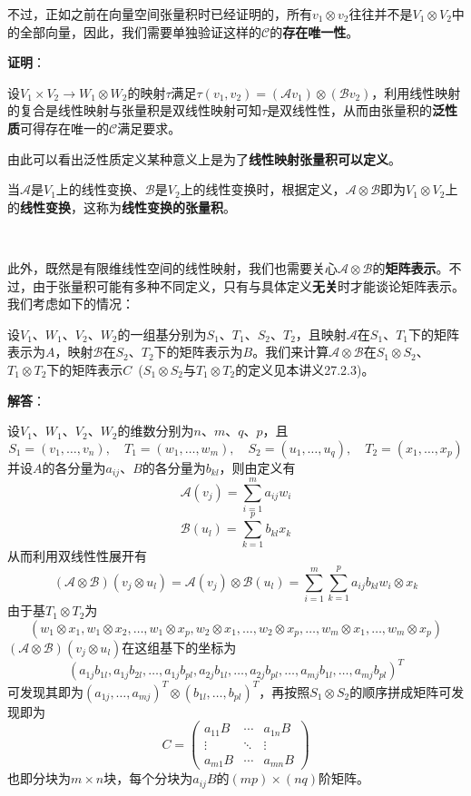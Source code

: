 \documentclass[a4paper,UTF8,fontset=windows,AutoFakeBold]{ctexart}
\newcommand*{\ma}{\mathcal{A}}
\newcommand*{\mb}{\mathcal{B}}
\newcommand*{\mc}{\mathcal{C}}
\newcommand*{\note}{\noindent *}
\newcommand{\proo}[1]{{\vspace{5pt}\kaishu\noindent\textbf{证明}：\vspace{-3pt}
\begin{compactitem}
    \item[] #1
\end{compactitem}
}}
\newcommand{\sol}[1]{{\vspace{5pt}\kaishu\noindent\textbf{解答}：\vspace{-3pt}
\begin{compactitem}
    \item[] #1
\end{compactitem}
}}
\begin{document}
不过，正如之前在向量空间张量积时已经证明的，所有$v_1\otimes v_2$往往并不是$V_1\otimes V_2$中的全部向量，因此，我们需要单独验证这样的$\mathcal{C}$的\textbf{存在唯一性}。

\proo{
    设$V_1\times V_2\to W_1\otimes W_2$的映射$\tau$满足$\tau(v_1,v_2)=(\ma v_1)\otimes(\mb v_2)$，利用线性映射的复合是线性映射与张量积是双线性映射可知$\tau$是双线性性，从而由张量积的\textbf{泛性质}可得存在唯一的$\mc$满足要求。
}

\note 由此可以看出泛性质定义某种意义上是为了\textbf{线性映射张量积可以定义}。

\note 当$\ma$是$V_1$上的线性变换、$\mb$是$V_2$上的线性变换时，根据定义，$\ma\otimes\mb$即为$V_1\otimes V_2$上的\textbf{线性变换}，这称为\textbf{线性变换的张量积}。

\

此外，既然是有限维线性空间的线性映射，我们也需要关心$\ma\otimes\mb$的\textbf{矩阵表示}。不过，由于张量积可能有多种不同定义，只有与具体定义\textbf{无关}时才能谈论矩阵表示。我们考虑如下的情况：

设$V_1$、$W_1$、$V_2$、$W_2$的一组基分别为$S_1$、$T_1$、$S_2$、$T_2$，且映射$\ma$在$S_1$、$T_1$下的矩阵表示为$A$，映射$\mb$在$S_2$、$T_2$下的矩阵表示为$B$。我们来计算$\ma\otimes\mb$在$S_1\otimes S_2$、$T_1\otimes T_2$下的矩阵表示$C$\ ($S_1\otimes S_2$与$T_1\otimes T_2$的定义见本讲义27.2.3)。

\sol{
    设$V_1$、$W_1$、$V_2$、$W_2$的维数分别为$n$、$m$、$q$、$p$，且
    $$S_1=(v_1,\dots,v_n),\quad T_1=(w_1,\dots,w_m),\quad S_2=(u_1,\dots,u_q),\quad T_2=(x_1,\dots,x_p)$$
    并设$A$的各分量为$a_{ij}$、$B$的各分量为$b_{kl}$，则由定义有
    $$\ma(v_j)=\sum_{i=1}^ma_{ij}w_i$$
    $$\mb(u_l)=\sum_{k=1}^pb_{kl}x_k$$
    从而利用双线性性展开有
    $$(\ma\otimes\mb)(v_j\otimes u_l)=\ma(v_j)\otimes\mb(u_l)=\sum_{i=1}^m\sum_{k=1}^pa_{ij}b_{kl}w_i\otimes x_k$$
    由于基$T_1\otimes T_2$为
    $$(w_1\otimes x_1,w_1\otimes x_2,\dots,w_1\otimes x_p,w_2\otimes x_1,\dots,w_2\otimes x_p,\dots,w_m\otimes x_1,\dots,w_m\otimes x_p)$$
    $(\ma\otimes\mb)(v_j\otimes u_l)$在这组基下的坐标为
    $$(a_{1j}b_{1l},a_{1j}b_{2l},\dots,a_{1j}b_{pl},a_{2j}b_{1l},\dots,a_{2j}b_{pl},\dots,a_{mj}b_{1l},\dots,a_{mj}b_{pl})^T$$
    可发现其即为$(a_{1j},\dots,a_{mj})^T\otimes(b_{1l},\dots,b_{pl})^T$，再按照$S_1\otimes S_2$的顺序拼成矩阵可发现即为
    $$C=\begin{pmatrix}a_{11}B&\cdots&a_{1n}B\\\vdots&\ddots&\vdots\\a_{m1}B&\cdots&a_{mn}B\end{pmatrix}$$
    也即分块为$m\times n$块，每个分块为$a_{ij}B$的$(mp)\times(nq)$阶矩阵。
}
\end{document}
